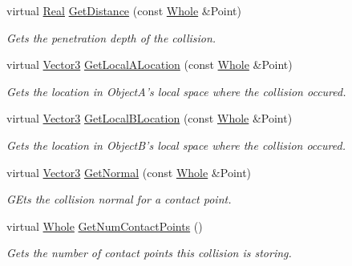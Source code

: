 \begin{DoxyCompactItemize}
virtual \hyperlink{namespaceMezzanine_a726731b1a7df72bf3583e4a97282c6f6}{Real} \hyperlink{classMezzanine_1_1Collision_a365b382bac319b1258369c9bdeeb5048}{GetDistance} (const \hyperlink{namespaceMezzanine_adcbb6ce6d1eb4379d109e51171e2e493}{Whole} \&Point)
\begin{DoxyCompactList}\small\item\em Gets the penetration depth of the collision. \item\end{DoxyCompactList}\item 
virtual \hyperlink{classMezzanine_1_1Vector3}{Vector3} \hyperlink{classMezzanine_1_1Collision_a63a18605e0f34392f8521cdc3afd4b62}{GetLocalALocation} (const \hyperlink{namespaceMezzanine_adcbb6ce6d1eb4379d109e51171e2e493}{Whole} \&Point)
\begin{DoxyCompactList}\small\item\em Gets the location in ObjectA's local space where the collision occured. \item\end{DoxyCompactList}\item 
virtual \hyperlink{classMezzanine_1_1Vector3}{Vector3} \hyperlink{classMezzanine_1_1Collision_a6a75e50b8e2160e356e96080206d60bb}{GetLocalBLocation} (const \hyperlink{namespaceMezzanine_adcbb6ce6d1eb4379d109e51171e2e493}{Whole} \&Point)
\begin{DoxyCompactList}\small\item\em Gets the location in ObjectB's local space where the collision occured. \item\end{DoxyCompactList}\item 
virtual \hyperlink{classMezzanine_1_1Vector3}{Vector3} \hyperlink{classMezzanine_1_1Collision_abd59dc03ed9226275e85681ec3ef1555}{GetNormal} (const \hyperlink{namespaceMezzanine_adcbb6ce6d1eb4379d109e51171e2e493}{Whole} \&Point)
\begin{DoxyCompactList}\small\item\em GEts the collision normal for a contact point. \item\end{DoxyCompactList}\item 
virtual \hyperlink{namespaceMezzanine_adcbb6ce6d1eb4379d109e51171e2e493}{Whole} \hyperlink{classMezzanine_1_1Collision_a75c8f35acf6ceba61b62da0049dcbf1c}{GetNumContactPoints} ()
\begin{DoxyCompactList}\small\item\em Gets the number of contact points this collision is storing. \item\end{DoxyCompactList}\item 

\end{DoxyCompactItemize}

